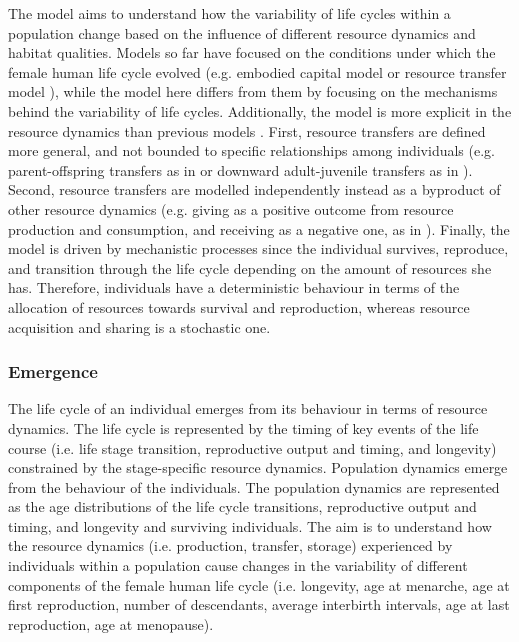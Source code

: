 \documentclass{article}
\begin{document}
The model aims to understand how the variability of life cycles within a population change based on the influence of different resource dynamics and habitat qualities. Models so far have focused on the conditions under which the female human life cycle evolved (e.g. embodied capital model \citep{kaplan1996theory} or resource transfer model \citep{chu2006co}), while the model here differs from them by focusing on the mechanisms behind the variability of life cycles. Additionally, the model is more explicit in the resource dynamics than previous models \citep{price2020fitness,kaplan1996theory,chu2006co,lee2003rethinking,kramer2010pooled, van1986acquisition}. First, resource transfers are defined more general, and not bounded to specific relationships among individuals (e.g. parent-offspring transfers as in \cite{kaplan1996theory} or downward adult-juvenile transfers as in \cite{chu2006co}). Second, resource transfers are modelled independently instead as a byproduct of other resource dynamics (e.g. giving as a positive outcome from resource production and consumption, and receiving as a negative one, as in \cite{lee2003rethinking,chu2006co}). Finally, the model is driven by mechanistic processes since the individual survives, reproduce, and transition through the life cycle depending on the amount of resources she has. Therefore, individuals have a deterministic behaviour in terms of the allocation of resources towards survival and reproduction, whereas resource acquisition and sharing is a stochastic one.

\subsubsection{Emergence}

The life cycle of an individual emerges from its behaviour in terms of resource dynamics. The life cycle is represented by the timing of key events of the life course (i.e. life stage transition, reproductive output and timing, and longevity) constrained by the stage-specific resource dynamics. Population dynamics emerge from the behaviour of the individuals. The population dynamics are represented as the age distributions of the life cycle transitions, reproductive output and timing, and longevity and surviving individuals. The aim is to understand how the resource dynamics (i.e. production, transfer, storage) experienced by individuals within a population cause changes in the variability of different components of the female human life cycle (i.e. longevity, age at menarche, age at first reproduction, number of descendants, average interbirth intervals, age at last reproduction, age at menopause).
\end{document}
